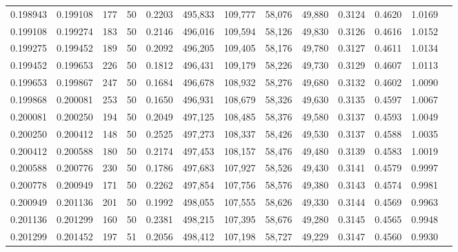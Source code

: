 \begin{tabular}{rrrrrrrrrrrrr}
0.198943 & 0.199108 &   177 &  50 &                                     0.2203 & 495,833 & 109,777 &  58,076 &  49,880 & 0.3124 & 0.4620 & 1.0169 \\
0.199108 & 0.199274 &   183 &  50 &                                     0.2146 & 496,016 & 109,594 &  58,126 &  49,830 & 0.3126 & 0.4616 & 1.0152 \\
0.199275 & 0.199452 &   189 &  50 &                                     0.2092 & 496,205 & 109,405 &  58,176 &  49,780 & 0.3127 & 0.4611 & 1.0134 \\
0.199452 & 0.199653 &   226 &  50 &                                     0.1812 & 496,431 & 109,179 &  58,226 &  49,730 & 0.3129 & 0.4607 & 1.0113 \\
0.199653 & 0.199867 &   247 &  50 &                                     0.1684 & 496,678 & 108,932 &  58,276 &  49,680 & 0.3132 & 0.4602 & 1.0090 \\
0.199868 & 0.200081 &   253 &  50 &                                     0.1650 & 496,931 & 108,679 &  58,326 &  49,630 & 0.3135 & 0.4597 & 1.0067 \\
0.200081 & 0.200250 &   194 &  50 &                                     0.2049 & 497,125 & 108,485 &  58,376 &  49,580 & 0.3137 & 0.4593 & 1.0049 \\
0.200250 & 0.200412 &   148 &  50 &                                     0.2525 & 497,273 & 108,337 &  58,426 &  49,530 & 0.3137 & 0.4588 & 1.0035 \\
0.200412 & 0.200588 &   180 &  50 &                                     0.2174 & 497,453 & 108,157 &  58,476 &  49,480 & 0.3139 & 0.4583 & 1.0019 \\
0.200588 & 0.200776 &   230 &  50 &                                     0.1786 & 497,683 & 107,927 &  58,526 &  49,430 & 0.3141 & 0.4579 & 0.9997 \\
0.200778 & 0.200949 &   171 &  50 &                                     0.2262 & 497,854 & 107,756 &  58,576 &  49,380 & 0.3143 & 0.4574 & 0.9981 \\
0.200949 & 0.201136 &   201 &  50 &                                     0.1992 & 498,055 & 107,555 &  58,626 &  49,330 & 0.3144 & 0.4569 & 0.9963 \\
0.201136 & 0.201299 &   160 &  50 &                                     0.2381 & 498,215 & 107,395 &  58,676 &  49,280 & 0.3145 & 0.4565 & 0.9948 \\
0.201299 & 0.201452 &   197 &  51 &                                     0.2056 & 498,412 & 107,198 &  58,727 &  49,229 & 0.3147 & 0.4560 & 0.9930 \\

\end{tabular}
